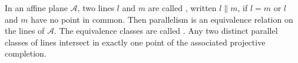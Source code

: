 In an affine plane $\mathcal{A}$, two lines $l$ and $m$ are called , written $l \parallel m$, if $l = m$ or $l$ and $m$ have no point in common. Then parallelism is an equivalence relation on the lines of $\mathcal{A}$. The equivalence classes are called . Any two distinct parallel classes of lines intersect in exactly one point of the associated projective completion.
